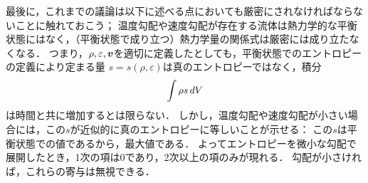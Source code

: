 最後に，これまでの議論は以下に述べる点においても厳密にされなければならないことに触れておこう；
温度勾配や速度勾配が存在する流体は熱力学的な平衡状態にはなく，（平衡状態で成り立つ）熱力学量の関係式は厳密には成り立たなくなる．
つまり，$\rho,\varepsilon,\vb*{v}$を適切に定義したとしても，平衡状態でのエントロピーの定義により定まる量
$s=s(\rho, \varepsilon)$は真のエントロピーではなく，積分
\[
    \int \rho s \, dV
\]
は時間と共に増加するとは限らない．
しかし，温度勾配や速度勾配が小さい場合には，この$s$が近似的に真のエントロピーに等しいことが示せる：
この$s$は平衡状態での値であるから，最大値である．
よってエントロピーを微小な勾配で展開したとき，1次の項は0であり，2次以上の項のみが現れる．
勾配が小さければ，これらの寄与は無視できる．









\BackToTheToc